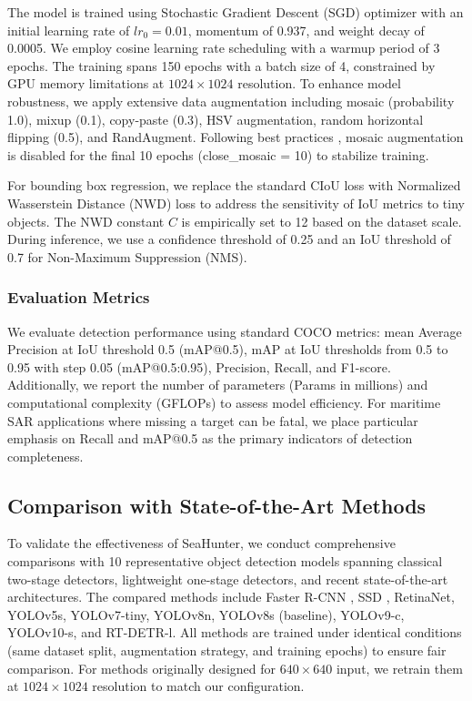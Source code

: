 The model is trained using Stochastic Gradient Descent (SGD) optimizer with an initial learning rate of $lr_0 = 0.01$, momentum of 0.937, and weight decay of 0.0005. We employ cosine learning rate scheduling with a warmup period of 3 epochs. The training spans 150 epochs with a batch size of 4, constrained by GPU memory limitations at $1024 \times 1024$ resolution. To enhance model robustness, we apply extensive data augmentation including mosaic (probability 1.0), mixup (0.1), copy-paste (0.3), HSV augmentation, random horizontal flipping (0.5), and RandAugment. Following best practices \cite{ref10}, mosaic augmentation is disabled for the final 10 epochs (close\_mosaic = 10) to stabilize training.

For bounding box regression, we replace the standard CIoU loss with Normalized Wasserstein Distance (NWD) loss to address the sensitivity of IoU metrics to tiny objects. The NWD constant $C$ is empirically set to 12 based on the dataset scale. During inference, we use a confidence threshold of 0.25 and an IoU threshold of 0.7 for Non-Maximum Suppression (NMS).

\subsubsection{Evaluation Metrics}
We evaluate detection performance using standard COCO metrics: mean Average Precision at IoU threshold 0.5 (mAP@0.5), mAP at IoU thresholds from 0.5 to 0.95 with step 0.05 (mAP@0.5:0.95), Precision, Recall, and F1-score. Additionally, we report the number of parameters (Params in millions) and computational complexity (GFLOPs) to assess model efficiency. For maritime SAR applications where missing a target can be fatal, we place particular emphasis on Recall and mAP@0.5 as the primary indicators of detection completeness.


\subsection{Comparison with State-of-the-Art Methods}

To validate the effectiveness of SeaHunter, we conduct comprehensive comparisons with 10 representative object detection models spanning classical two-stage detectors, lightweight one-stage detectors, and recent state-of-the-art architectures. The compared methods include Faster R-CNN \cite{ref8}, SSD \cite{ref9}, RetinaNet, YOLOv5s, YOLOv7-tiny, YOLOv8n, YOLOv8s (baseline), YOLOv9-c, YOLOv10-s, and RT-DETR-l. All methods are trained under identical conditions (same dataset split, augmentation strategy, and training epochs) to ensure fair comparison. For methods originally designed for $640 \times 640$ input, we retrain them at $1024 \times 1024$ resolution to match our configuration.


